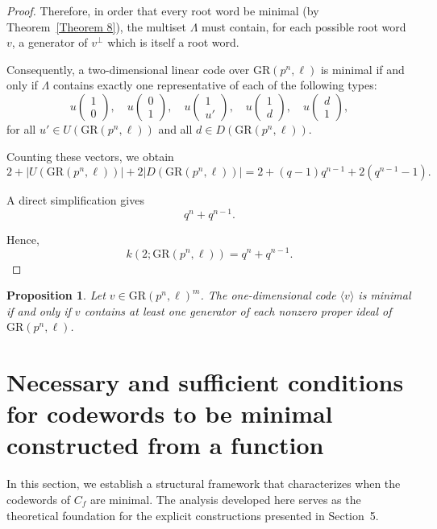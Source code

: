 \documentclass[10pt]{article}
\newtheorem{prop}[lem]{Proposition}
\theoremstyle{definition}
\begin{document}
\begin{proof}
Therefore, in order that every root word be minimal (by Theorem~\ref{Theorem 8}), the multiset $\Lambda$ must contain, for each possible root word $v$, a generator of $v^{\perp}$ which is itself a root word.

Consequently, a two-dimensional linear code over $\mathrm{GR}(p^{n},\ell)$ is minimal if and only if $\Lambda$ contains exactly one representative of each of the following types:
\[
u\begin{pmatrix}1\\0\end{pmatrix}, \quad
u\begin{pmatrix}0\\1\end{pmatrix}, \quad
u\begin{pmatrix}1\\u'\end{pmatrix}, \quad
u\begin{pmatrix}1\\d\end{pmatrix}, \quad
u\begin{pmatrix}d\\1\end{pmatrix},
\]
for all $u' \in U(\mathrm{GR}(p^{n},\ell))$ and all $d \in D(\mathrm{GR}(p^{n},\ell))$.

Counting these vectors, we obtain
\[
2
+
|U(\mathrm{GR}(p^{n},\ell))|
+
2|D(\mathrm{GR}(p^{n},\ell))|
=
2
+
(q-1)q^{n-1}
+
2(q^{n-1}-1).
\]

A direct simplification gives
\[
q^{n} + q^{n-1}.
\]

Hence,
\[
k(2;\mathrm{GR}(p^{n},\ell)) = q^{n} + q^{n-1}.
\]
\end{proof}


\begin{prop}\label{Proposition 27}
Let $v \in \mathrm{GR}(p^{n},\ell)^{m}$.
The one-dimensional code $\langle v \rangle$ is minimal if and only if
$v$ contains at least one generator of each nonzero proper ideal of
$\mathrm{GR}(p^{n},\ell)$.
\end{prop}





\section{Necessary and sufficient conditions for codewords to be minimal constructed from a function}\label{Section 4}

In this section, we establish a structural framework that characterizes
when the codewords of $C_f$ are minimal.
The analysis developed here serves as the theoretical foundation
for the explicit constructions presented in Section~5.
\end{document}
